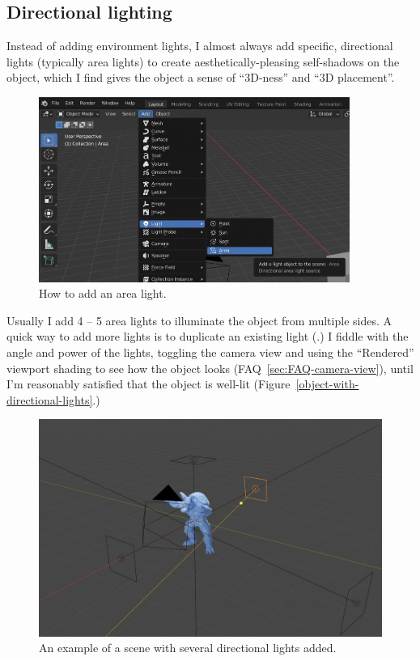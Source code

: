 \documentclass[10pt]{article}
\begin{document}
\subsection{Directional lighting}
\label{sec:DirectionalLighting}
Instead of adding environment lights, I almost always add specific, directional lights (typically area lights) to create aesthetically-pleasing self-shadows on the object, which I find gives the object a sense of ``3D-ness'' and ``3D placement''. 
\begin{figure}[H]
    \centering
    \includegraphics[width=4in]{images/adding-area-light.png}
    \caption{How to add an area light.}
\end{figure}
Usually I add 4 -- 5 area lights to illuminate the object from multiple sides. A quick way to add more lights is to duplicate an existing light (.) I fiddle with the angle and power of the lights, toggling the camera view and using the ``Rendered'' viewport shading to see how the object looks (FAQ~\ref{sec:FAQ-camera-view}), until I'm reasonably satisfied that the object is well-lit (Figure~\ref{object-with-directional-lights}.) 
\begin{figure}[H]
    \centering
    \includegraphics[width=5in]{images/object-with-directional-lights.png}
    \caption{An example of a scene with several directional lights added.}
    \label{fig:object-with-directional-lights}
\end{figure}
\end{document}
